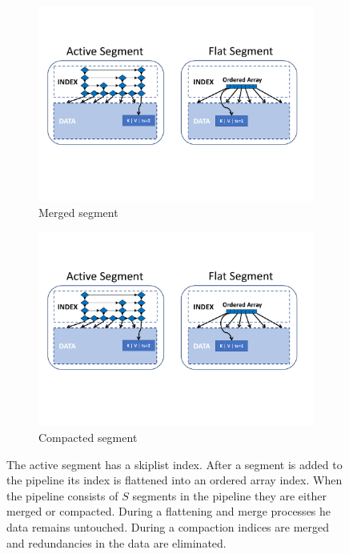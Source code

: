 \begin{figure}[tb]
\begin{subfigure}[t]{0.5\columnwidth}
      \includegraphics[width=\figw]{flat-seg.pdf}
      \caption[]{Merged segment}
    \label{fig:flattening:merge}
  \end{subfigure}
  \begin{subfigure}[t]{0.5\columnwidth}
      \includegraphics[width=\figw]{flat-seg.pdf}
      \caption[]{Compacted segment}
    \label{fig:flattening:compaction}
  \end{subfigure}

\caption{The active segment has a skiplist index. After a segment is added to the pipeline its index is flattened into an ordered array index. When the pipeline consists of $S$ segments in the pipeline they are either merged or compacted. During a flattening and merge processes  he data remains untouched. During a compaction indices are merged and redundancies in the data are eliminated.} 
\label{fig:flattening}
\end{figure}

